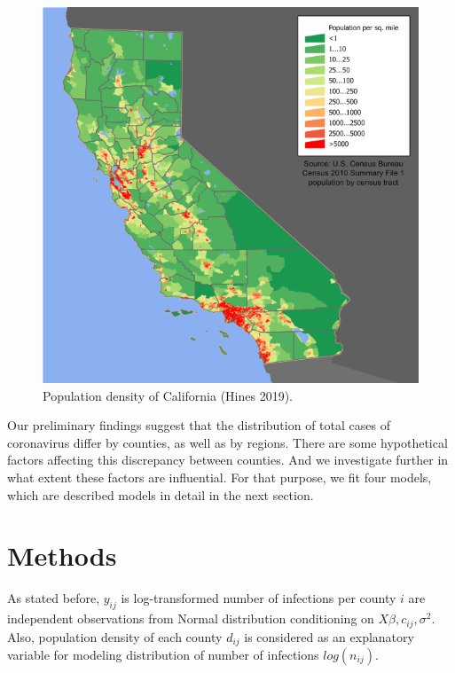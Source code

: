 \documentclass[11pt,twocolumn]{asaproc}
\begin{document}
\begin{figure}[t]
\centering\includegraphics[scale=.30]{density.png}
\caption{Population density of California (Hines 2019).}
\label{fig:density}
\end{figure}

Our preliminary findings suggest that the distribution of total cases of coronavirus differ by counties, as well as by regions. There are some hypothetical factors affecting this discrepancy between counties. And we investigate further in what extent these factors are influential. For that purpose, we fit four models, which are described models in detail in the next section. 








\section{Methods}

As stated before, $y_{ij}$ is log-transformed number of infections per county $i$ are independent observations from Normal distribution conditioning on $X \beta, c_{ij}, \sigma^2$. Also, population density of each county $d_{ij}$ is considered as an explanatory variable for modeling distribution of number of infections $log(n_{ij})$. 
\end{document}
